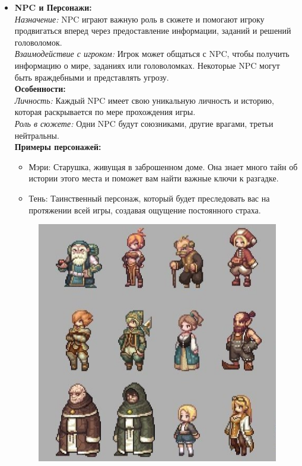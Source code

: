 \documentclass{article}
\begin{document}
\begin{itemize}
		\item \textbf{NPC и Персонажи:}  \\
		\textit{Назначение:} NPC играют важную роль в сюжете и помогают игроку продвигаться вперед через предоставление информации, заданий и решений головоломок.  \\
		\textit{Взаимодействие с игроком:} Игрок может общаться с NPC, чтобы получить информацию о мире, заданиях или головоломках. Некоторые NPC могут быть враждебными и представлять угрозу.  \\
		\textbf{Особенности:}  \\
		\textit{Личность:} Каждый NPC имеет свою уникальную личность и историю, которая раскрывается по мере прохождения игры.  \\
		\textit{Роль в сюжете:} Одни NPC будут союзниками, другие врагами, третьи нейтральны.  \\
		\textbf{Примеры персонажей:}
		\begin{itemize}
			\item Мэри: Старушка, живущая в заброшенном доме. Она знает много тайн об истории этого места и поможет вам найти важные ключи к разгадке.
			\item Тень: Таинственный персонаж, который будет преследовать вас на протяжении всей игры, создавая ощущение постоянного страха.
		\end{itemize}
		\begin{figure}[h]
			\centering
			\begin{minipage}{0.4\textwidth}
				\centering
				\includegraphics[width=\textwidth]{images/civilians.jpg}

\end{minipage}
\end{figure}
\end{itemize}
\end{document}
